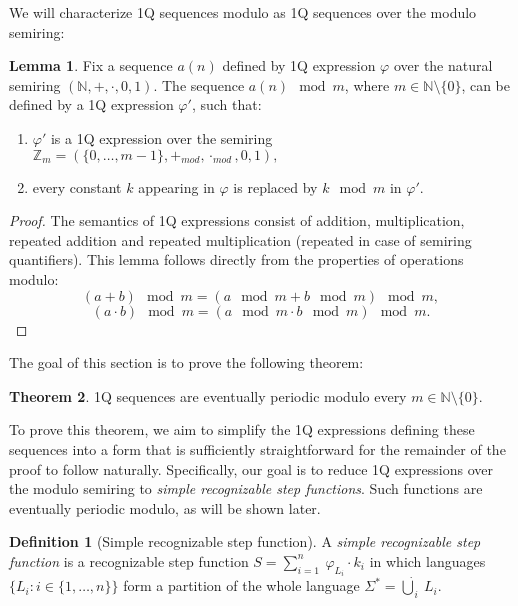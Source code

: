 \documentclass[12pt]{article}
\theoremstyle{definition}
\newtheorem{definition}{Definition}[section]
\newtheorem{theorem}{Theorem}[section]
\newtheorem{lemma}[theorem]{Lemma}
\begin{document}
We will characterize 1Q sequences modulo as 1Q sequences over the modulo semiring:

\begin{lemma}
    \label{1QModulo}
    Fix a sequence $a(n)$ defined by 1Q expression $\varphi$ over the natural semiring $(\mathbb{N}, +, \cdot, 0, 1)$. The sequence $a(n) \mod m$, where $m \in \mathbb{N} \setminus \{0\}$, can be defined by a 1Q expression $\varphi'$, such that:
    \begin{enumerate}
        \item $\varphi'$ is a 1Q expression over the semiring $\mathbb{Z}_m = (\{0,\ldots,m-1\}, +_{mod}, \cdot_{mod}, 0, 1),$
        \item every constant $k$ appearing in $\varphi$ is replaced by $k \mod m$ in $\varphi'.$
    \end{enumerate}
\end{lemma}

\begin{proof}
    The semantics of 1Q expressions consist of addition, multiplication, repeated addition and repeated multiplication (repeated in case of semiring quantifiers). This lemma follows directly from the properties of operations modulo:
    $$(a + b) \mod m = (a \mod m + b \mod m) \mod m,$$
    $$(a \cdot b) \mod m = (a \mod m \cdot b \mod m) \mod m.$$
\end{proof}

The goal of this section is to prove the following theorem:

\begin{theorem}
    \label{1QSequencesPeriodic}
    1Q sequences are eventually periodic modulo every $m \in \mathbb{N} \setminus \{0\}$.
\end{theorem}

To prove this theorem, we aim to simplify the 1Q expressions defining these sequences into a form that is sufficiently straightforward for the remainder of the proof to follow naturally. Specifically, our goal is to reduce 1Q expressions over the modulo semiring to \emph{simple recognizable step functions}. Such functions are eventually periodic modulo, as will be shown later.

\begin{definition}[Simple recognizable step function]
    \label{DefSimpleRecStepFun}
    A \textit{simple recognizable step function} is a recognizable step function $S = \sum_{i = 1}^{n} \ \varphi_{L_i} \cdot k_i$ in which languages $\{L_i : i \in \{1,\ldots,n\}\}$ form a partition of the whole language $\Sigma^* = \dot{\bigcup}_i \ L_i$.
\end{definition}
\end{document}
